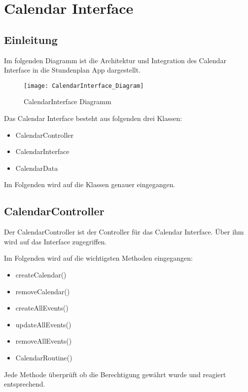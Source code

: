 \chapter{Calendar Interface}
\section{Einleitung}
Im folgenden Diagramm ist die Architektur und Integration des Calendar Interface in die Stundenplan App dargestellt.
\begin{figure}[htb]
    \centering
    \texttt{[image: CalendarInterface\_Diagram]}
    \caption{CalendarInterface Diagramm}
\end{figure}

Das Calendar Interface besteht aus folgenden drei Klassen:
\begin{itemize}
     \item CalendarController
     \item CalendarInterface
     \item CalendarData
\end{itemize}

Im Folgenden wird auf die Klassen genauer eingegangen.

\newpage
\section{CalendarController}
Der CalendarController ist der Controller für das Calendar Interface. Über ihm wird auf das Interface zugegriffen.

Im Folgenden wird auf die wichtigsten Methoden eingegangen:
\begin{itemize}
     \item createCalendar()
     \item removeCalendar()
     \item createAllEvents()
     \item updateAllEvents()
     \item removeAllEvents()
     \item CalendarRoutine()     
\end{itemize}

Jede Methode überprüft ob die Berechtigung gewährt wurde und reagiert entsprechend.


